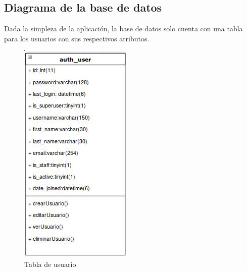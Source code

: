 \documentclass[9pt]{article}
\begin{document}
\subsection{Diagrama de la base de datos}
Dada la simpleza de la aplicación, la base de datos solo cuenta con una tabla para los usuarios con sus respectivos atributos.\\
\begin{figure}[H]
  \centering
  \includegraphics[scale=0.5]{db}
  \caption{Tabla de usuario}
\end{figure}
\end{document}
